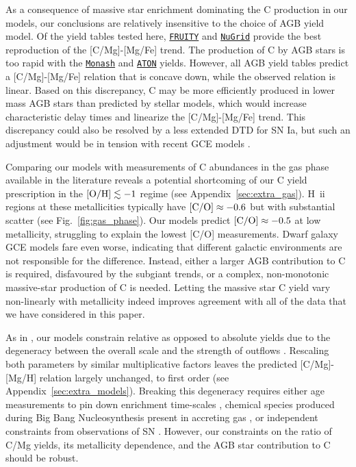 \documentclass[fleqn,
usenatbib]{mnras}
\newcommand{\fruity}{\texttt{\hyperlink{fruity}{FRUITY}}}
\newcommand{\nugrid}{\texttt{\hyperlink{nugrid}{NuGrid}}}
\newcommand{\monash}{\texttt{\hyperlink{monash}{Monash}}}
\newcommand{\aton}{\texttt{\hyperlink{aton}{ATON}}}
\newcommand{\caah}{[C/Mg]-[Mg/H]}
\newcommand{\caafe}{[C/Mg]-[Mg/Fe]}
\newcommand{\co}{{\rm [C/O]}}
\newcommand{\Hii}{H~{\sc ii}}
\begin{document}
As a consequence of massive star enrichment dominating the C production in our models, our conclusions are relatively insensitive to the choice of AGB yield model. Of the yield tables tested here, \fruity{} and \nugrid{} provide the best reproduction of the \caafe{} trend. The production of C by AGB stars is too rapid with the \monash{} and \aton{} yields. However, all AGB yield tables predict a \caafe{} relation that is concave down, while the observed relation is linear. Based on this discrepancy, C may be more efficiently produced in lower mass AGB stars than predicted by stellar models, which would increase characteristic delay times and linearize the \caafe{} trend. This discrepancy could also be resolved by a less extended DTD for SN Ia, but such an adjustment would be in tension with recent GCE models \citep{palicio+2024, dubay+24}.


Comparing our models with measurements of C abundances in the gas phase available in the literature reveals a potential shortcoming of our C yield prescription in the ${\rm [O/H]} \lesssim -1$ regime (see Appendix~\ref{sec:extra_gas}). \Hii{} regions at these metallicities typically have $\co \approx -0.6$ but with substantial scatter (see Fig.~\ref{fig:gas_phase}). Our models predict $\co \approx -0.5$ at low metallicity, struggling to explain the lowest [C/O] measurements. Dwarf galaxy GCE models fare even worse, indicating that different galactic environments are not responsible for the difference. Instead, either a larger AGB contribution to C is required, disfavoured by the subgiant trends, or a complex, non-monotonic massive-star production of C is needed. Letting the massive star C yield vary non-linearly with metallicity indeed improves agreement with all of the data that we have considered in this paper. 

As in \citet{james+23}, our models constrain relative as opposed to absolute yields due to the degeneracy between the overall scale and the strength of outflows \citep[e.g.,][]{hartwick1976,james+23, sandford+24}. Rescaling both parameters by similar multiplicative factors leaves the predicted \caah{} relation largely unchanged, to first order (see Appendix~\ref{sec:extra_models}). Breaking this degeneracy requires either age measurements to pin down enrichment time-scales \citep{james+24}, chemical species produced during Big Bang Nucleosynthesis present in accreting gas \citep{cooke+2022, james+25}, or independent constraints from observations of SN \citep[e.g.,][]{rodriguez+23,david_fe}. However, our constraints on the ratio of C/Mg yields, its metallicity dependence, and the AGB star contribution to C should be robust.
\end{document}

